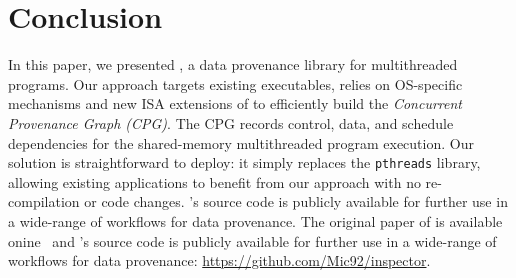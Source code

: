 \section{Conclusion}
\label{sec:conclusion}

In this paper, we presented \projecttitle, a data provenance library for multithreaded programs. Our approach targets existing executables, relies on OS-specific mechanisms and new ISA extensions of \intelpt  to efficiently build the {\em Concurrent Provenance Graph (CPG)}. The CPG records control, data, and schedule dependencies for the shared-memory multithreaded program execution. Our solution is straightforward to deploy: it simply replaces the {\tt pthreads} library, allowing existing applications to benefit from our approach with no re-compilation or code changes. \projecttitle's source code is publicly available for further use in a wide-range of workflows for data provenance. The original paper of  \projecttitle is available onine~\cite{inspector-icdcs} and \projecttitle's source code is publicly available for further use in a wide-range of workflows for data provenance:  \href{https://github.com/Mic92/inspector}{ https://github.com/Mic92/inspector}.



 
